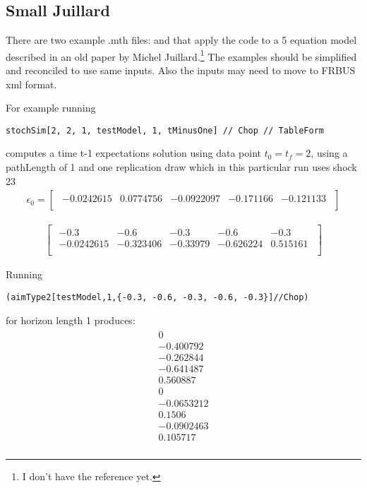 
\subsection{Small Juillard}
\label{sec:small-juillard}
There are two example .mth files:  and  that apply the code to a 5 equation model described in an old paper by
Michel Juillard.\footnote{I don't have the reference yet.} The examples should
be simplified and reconciled to use same inputs.  Also the inputs may need
to move to FRBUS xml format.



For example running


\begin{verbatim}
stochSim[2, 2, 1, testModel, 1, tMinusOne] // Chop // TableForm
\end{verbatim}
computes a time t-1 expectations solution using data point $t_0=t_f=2$, using a pathLength of 1 and one replication draw 
which in this particular run uses
shock {23}
\begin{gather*}\epsilon_0=
  \begin{bmatrix}\begin{array}{ccccc}
 -0.0242615 & 0.0774756 & -0.0922097 & -0.171166 & -0.121133 \\
\end{array}
  \end{bmatrix}
\end{gather*}

\begin{gather*}
  \begin{bmatrix}\begin{array}{ccccc}
 -0.3 & -0.6 & -0.3 & -0.6 & -0.3 \\
 -0.0242615 & -0.323406 & -0.33979 & -0.626224 & 0.515161 \\
\end{array}
\end{bmatrix}\end{gather*}

Running 
\begin{verbatim}
(aimType2[testModel,1,{-0.3, -0.6, -0.3, -0.6, -0.3}]//Chop)
\end{verbatim}
for horizon length 1 produces:
{\small
\begin{gather*}\begin{array}{c}
 0 \\
 -0.400792 \\
 -0.262844 \\
 -0.641487 \\
 0.560887 \\
 0 \\
 -0.0653212 \\
 0.1506 \\
 -0.0902463 \\
 0.105717 \\
\end{array}
\end{gather*}
}




